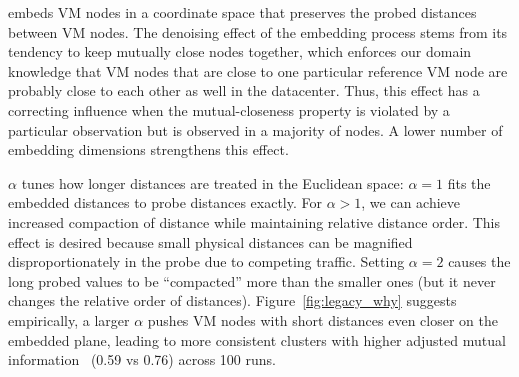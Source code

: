 \marcopolo embeds VM nodes in a coordinate space that preserves the probed distances between VM nodes. The denoising effect of the embedding process stems from its tendency to keep mutually close nodes together, which enforces our domain knowledge that VM nodes that are close to one particular reference VM node are probably close to each other as well in the datacenter. Thus, this effect has a correcting influence when the mutual-closeness property is violated by a particular observation but is observed in a majority of nodes. A lower number of embedding dimensions strengthens this effect.

$\alpha$ tunes how longer distances are treated in the Euclidean space: $\alpha=1$ fits the embedded distances to probe distances exactly. For $\alpha>1$, we can achieve increased compaction of distance while maintaining relative distance order. This effect is desired because small physical distances can be magnified disproportionately in the probe due to competing traffic. Setting $\alpha=2$ causes the long probed values to be ``compacted'' more than the smaller ones (but it never changes the relative order of distances). Figure~\ref{fig:legacy_why} suggests empirically, a larger $\alpha$ pushes VM nodes with short distances even closer on the embedded plane, leading to more consistent clusters with higher adjusted mutual information~\cite{vinh2010information} (0.59 vs 0.76) across 100 runs.


